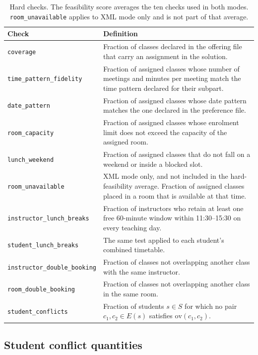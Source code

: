 \begin{table}[H]
\centering
\caption{Hard checks. The feasibility score averages the ten checks used in both modes.
\texttt{room\_unavailable} applies to XML mode only and is not part of that average.}
\label{tab:hardkpi}
\footnotesize
\begin{tabular}{@{}L{3.5cm}L{11.4cm}@{}}
\toprule
\textbf{Check} & \textbf{Definition} \\
\midrule
\texttt{coverage} &
  Fraction of classes declared in the offering file that carry an assignment in the solution. \\
\texttt{time\_pattern\_fidelity} &
  Fraction of assigned classes whose number of meetings and minutes per meeting match the time
  pattern declared for their subpart. \\
\texttt{date\_pattern} &
  Fraction of assigned classes whose date pattern matches the one declared in the preference file. \\
\texttt{room\_capacity} &
  Fraction of assigned classes whose enrolment limit does not exceed the capacity of the assigned
  room. \\
\texttt{lunch\_weekend} &
  Fraction of assigned classes that do not fall on a weekend or inside a blocked slot. \\
\texttt{room\_unavailable} &
  XML mode only, and not included in the hard-feasibility average. Fraction of assigned classes
  placed in a room that is available at that time. \\
\texttt{instructor\_lunch\_breaks} &
  Fraction of instructors who retain at least one free 60-minute window within 11:30--15:30 on
  every teaching day. \\
\texttt{student\_lunch\_breaks} &
  The same test applied to each student's combined timetable. \\
\texttt{instructor\_double\_booking} &
  Fraction of classes not overlapping another class with the same instructor. \\
\texttt{room\_double\_booking} &
  Fraction of classes not overlapping another class in the same room. \\
\texttt{student\_conflicts} &
  Fraction of students $s \in S$ for which no pair $c_1,c_2 \in E(s)$ satisfies
  $\mathrm{ov}(c_1,c_2)$. \\
\bottomrule
\end{tabular}
\end{table}

\subsection{Student conflict quantities}

